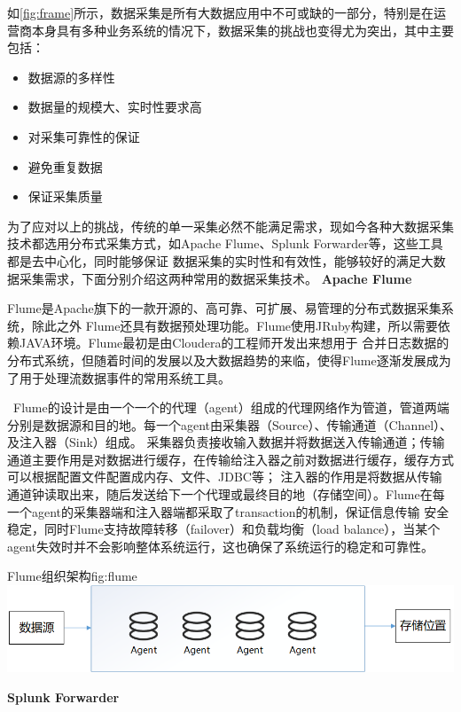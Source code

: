 \documentclass{HustGraduPaper}
\begin{document}
    如\autoref{fig:frame}所示，数据采集是所有大数据应用中不可或缺的一部分，特别是在运营商本身具有多种业务系统的情况下，数据采集的挑战也变得尤为突出，其中主要包括：
    \begin{itemize}
		\item 数据源的多样性
        \item 数据量的规模大、实时性要求高
        \item 对采集可靠性的保证
        \item 避免重复数据
        \item 保证采集质量
    \end{itemize}
    为了应对以上的挑战，传统的单一采集必然不能满足需求，现如今各种大数据采集技术都选用分布式采集方式，如Apache Flume、Splunk Forwarder等，这些工具都是去中心化，同时能够保证
    数据采集的实时性和有效性，能够较好的满足大数据采集需求，下面分别介绍这两种常用的数据采集技术。
    \bigskip
    {\songti \bfseries Apache Flume\\}

    Flume是Apache旗下的一款开源的、高可靠、可扩展、易管理的分布式数据采集系统，除此之外 Flume还具有数据预处理功能。Flume使用JRuby构建，所以需要依赖JAVA环境。Flume最初是由Cloudera的工程师开发出来想用于
    合并日志数据的分布式系统，但随着时间的发展以及大数据趋势的来临，使得Flume逐渐发展成为了用于处理流数据事件的常用系统工具。%

    \ Flume的设计是由一个一个的代理（agent）组成的代理网络作为管道，管道两端分别是数据源和目的地。每一个agent由采集器（Source）、传输通道（Channel）、及注入器（Sink）组成。
    采集器负责接收输入数据并将数据送入传输通道；传输通道主要作用是对数据进行缓存，在传输给注入器之前对数据进行缓存，缓存方式可以根据配置文件配置成内存、文件、JDBC等；
    注入器的作用是将数据从传输通道钟读取出来，随后发送给下一个代理或最终目的地（存储空间）。Flume在每一个agent的采集器端和注入器端都采取了transaction的机制，保证信息传输
    安全稳定，同时Flume支持故障转移（failover）和负载均衡（load balance），当某个agent失效时并不会影响整体系统运行，这也确保了系统运行的稳定和可靠性。

    \begin{generalfig}{Flume组织架构}{fig:flume}
        \includegraphics[width=\textwidth]{Figures/flume.png}
    \end{generalfig}
    {\songti \bfseries Splunk Forwarder\\}
    
\end{document}
